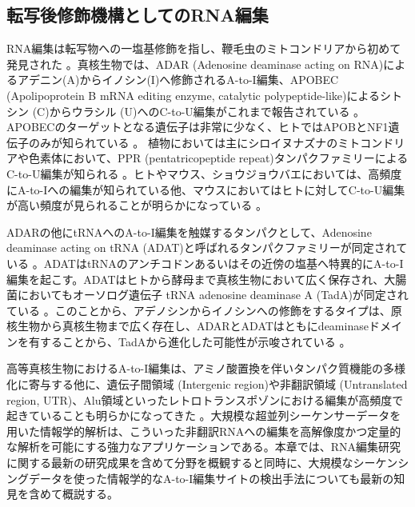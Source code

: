 \subsection{転写後修飾機構としてのRNA編集}
RNA編集は転写物への一塩基修飾を指し、鞭毛虫のミトコンドリアから初めて発見された \citep{BenVanBra8609}。真核生物では、ADAR (Adenosine deaminase acting on RNA)によるアデニン(A)からイノシン(I)へ修飾されるA-to-I編集、APOBEC (Apolipoprotein B mRNA editing enzyme, catalytic polypeptide-like)によるシトシン (C)からウラシル (U)へのC-to-U編集がこれまで報告されている \citep{BenVanBra8609}。APOBECのターゲットとなる遺伝子は非常に少なく、ヒトではAPOBとNF1遺伝子のみが知られている \citep{CapFreSku9702}。
植物においては主にシロイヌナズナのミトコンドリアや色素体において、PPR (pentatricopeptide repeat)タンパクファミリーによるC-to-U編集が知られる \citep{Shi0603, MenCheJin10}。ヒトやマウス、ショウジョウバエにおいては、高頻度にA-to-Iへの編集が知られている他、マウスにおいてはヒトに対してC-to-U編集が高い頻度が見られることが明らかになっている \citep{Danecek:2012aa, Gu:2012aa}。
\par
ADARの他にtRNAへのA-to-I編集を触媒するタンパクとして、Adenosine deaminase acting on tRNA (ADAT)と呼ばれるタンパクファミリーが同定されている \citep{MaaGerRic9908}。ADATはtRNAのアンチコドンあるいはその近傍の塩基へ特異的にA-to-I編集を起こす。ADATはヒトから酵母まで真核生物において広く保存され、大腸菌においてもオーソログ遺伝子 tRNA adenosine deaminase A (TadA)が同定されている \citep{WolGerKel0207}。このことから、アデノシンからイノシンへの修飾をするタイプは、原核生物から真核生物まで広く存在し、ADARとADATはともにdeaminaseドメインを有することから、TadAから進化した可能性が示唆されている \citep{GerKel0106}。
\par
高等真核生物におけるA-to-I編集は、アミノ酸置換を伴いタンパク質機能の多様化に寄与する他に、遺伝子間領域 (Intergenic region)や非翻訳領域 (Untranslated region, UTR)、Alu領域といったレトロトランスポゾンにおける編集が高頻度で起きていることも明らかになってきた \citep{Ramaswami:2012aa,Bazak:2013aa}。大規模な超並列シーケンサーデータを用いた情報学的解析は、こういった非翻訳RNAへの編集を高解像度かつ定量的な解析を可能にする強力なアプリケーションである。本章では、RNA編集研究に関する最新の研究成果を含めて分野を概観すると同時に、大規模なシーケンシングデータを使った情報学的なA-to-I編集サイトの検出手法についても最新の知見を含めて概説する。

